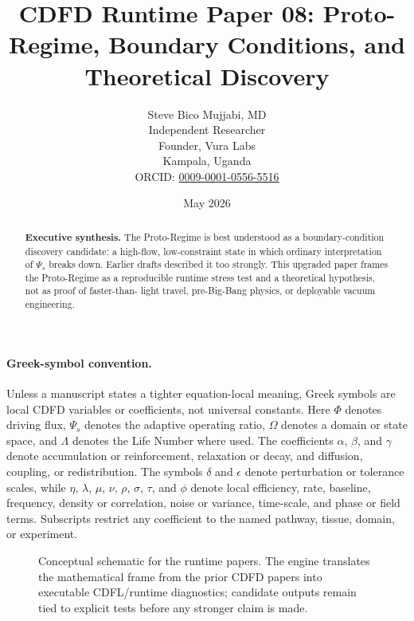 \documentclass[12pt,a4paper]{article}
\title{\textbf{CDFD Runtime Paper 08: Proto-Regime, Boundary Conditions, and Theoretical Discovery}}
\author{Steve Bico Mujjabi, MD\\
\small Independent Researcher\\
\small Founder, Vura Labs\\
\small Kampala, Uganda\\
\small ORCID: \href{https://orcid.org/0009-0001-0556-5516}{0009-0001-0556-5516}}
\date{May 2026}
\begin{document}
\maketitle

\begin{abstract}
\noindent \textbf{Executive synthesis.} The Proto-Regime is best understood as
a boundary-condition discovery candidate: a high-flow, low-constraint state in
which ordinary interpretation of $\Psi_s$ breaks down. Earlier drafts described
it too strongly. This upgraded paper frames the Proto-Regime as a reproducible
runtime stress test and a theoretical hypothesis, not as proof of faster-than-
light travel, pre-Big-Bang physics, or deployable vacuum engineering.
\end{abstract}

\paragraph{Greek-symbol convention.}
Unless a manuscript states a tighter equation-local meaning, Greek symbols are local CDFD variables or coefficients, not universal constants. Here $\Phi$ denotes driving flux, $\Psi_s$ denotes the adaptive operating ratio, $\Omega$ denotes a domain or state space, and $\Lambda$ denotes the Life Number where used. The coefficients $\alpha$, $\beta$, and $\gamma$ denote accumulation or reinforcement, relaxation or decay, and diffusion, coupling, or redistribution. The symbols $\delta$ and $\epsilon$ denote perturbation or tolerance scales, while $\eta$, $\lambda$, $\mu$, $\nu$, $\rho$, $\sigma$, $\tau$, and $\phi$ denote local efficiency, rate, baseline, frequency, density or correlation, noise or variance, time-scale, and phase or field terms. Subscripts restrict any coefficient to the named pathway, tissue, domain, or experiment.


\begin{figure}[ht]
\centering
{}
\caption{Conceptual schematic for the runtime papers. The engine translates the mathematical frame from the prior CDFD papers into executable CDFL/runtime diagnostics; candidate outputs remain tied to explicit tests before any stronger claim is made.}
\end{figure}
\end{document}
